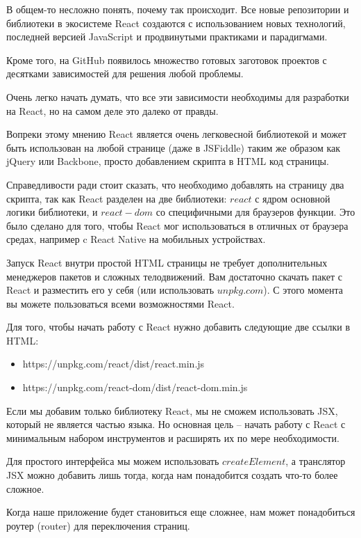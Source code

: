 В общем-то несложно понять, почему так происходит. Все новые репозитории и библиотеки в экосистеме React создаются с использованием новых технологий, последней версией JavaScript и продвинутыми практиками и парадигмами.

Кроме того, на GitHub появилось множество готовых заготовок проектов с десятками зависимостей для решения любой проблемы.

Очень легко начать думать, что все эти зависимости необходимы для разработки на React, но на самом деле это далеко от правды.

Вопреки этому мнению React является очень легковесной библиотекой и может быть использован на любой странице (даже в JSFiddle) таким же образом как jQuery или Backbone, просто добавлением скрипта в HTML код страницы.

Справедливости ради стоит сказать, что необходимо добавлять на страницу два скрипта, так как React разделен на две библиотеки: $react$ с ядром основной логики библиотеки, и $react-dom$ со специфичными для браузеров функции. Это было сделано для того, чтобы React мог использоваться в отличных от браузера средах, например c React Native на мобильных устройствах.

Запуск React внутри простой HTML страницы не требует дополнительных менеджеров пакетов и сложных телодвижений. Вам достаточно скачать пакет с React и разместить его у себя (или использовать $unpkg.com$). С этого момента вы можете пользоваться всеми возможностями React.

Для того, чтобы начать работу с React нужно добавить следующие две ссылки в HTML:

\begin{itemize}
  \item https://unpkg.com/react/dist/react.min.js
  \item https://unpkg.com/react-dom/dist/react-dom.min.js
\end{itemize}

Если мы добавим только библиотеку React, мы не сможем использовать JSX, который не является частью языка. Но основная цель -- начать работу с React с минимальным набором инструментов и расширять их по мере необходимости.

Для простого интерфейса мы можем использовать $createElement$, а транслятор JSX можно добавить лишь тогда, когда нам понадобится создать что-то более сложное.

Когда наше приложение будет становиться еще сложнее, нам может понадобиться роутер (router) для переключения страниц.

